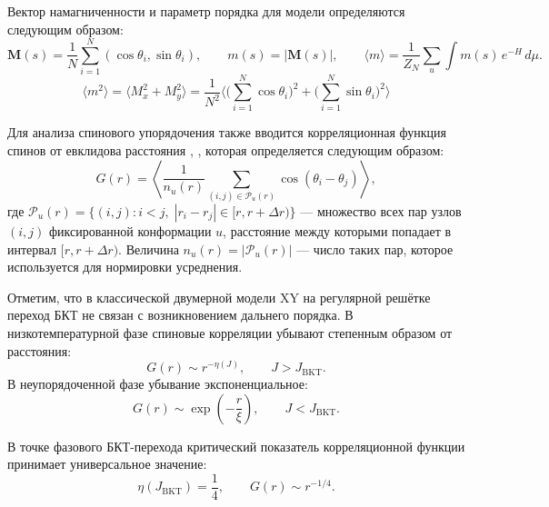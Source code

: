   
 Вектор намагниченности и параметр порядка для модели определяются следующим образом:
 \begin{equation}
 		\label{xy_mean_magnetization}
 	\mathbf M(s)=\frac{1}{N}\sum_{i=1}^N (\cos\theta_i,\sin\theta_i),\qquad m(s)=|\mathbf M(s)|,\qquad \langle m\rangle=\frac{1}{Z_N}\sum_{u}\int m(s)\,e^{-H}\,d\mu.
 \end{equation}
  \begin{equation}
 \langle m^2\rangle
 = \Big\langle M_x^2+M_y^2\Big\rangle
 = \frac{1}{N^2}\Big\langle \Big(\sum_{i=1}^N \cos\theta_i\Big)^2
 + \Big(\sum_{i=1}^N \sin\theta_i\Big)^2 \Big\rangle
  \end{equation}
  
  
  Для анализа спинового упорядочения также вводится корреляционная функция
  спинов от евклидова расстояния \cite{Berezinskii1970ZhETF}, \cite{kosterlitz1973ordering}, которая определяется следующим образом: 
  \begin{equation}
  	\label{xy_spin_correlation}
  	G(r)
  	=
  	\left\langle
  	\frac{1}{n_u(r)}
  	\sum_{(i,j)\in \mathcal P_u(r)}
  	\cos(\theta_i-\theta_j)
  	\right\rangle ,
  \end{equation} 
  где $
  	\mathcal P_u(r)
  	=	\{(i,j): i<j,\; |r_i-r_j|\in [r,r+\Delta r)\}  $ --- множество всех пар узлов $(i,j)$ фиксированной 
  	конформации $u$, расстояние между которыми попадает в интервал
  	$[r,r+\Delta r)$.
  	Величина $n_u(r)=|\mathcal P_u(r)|$  --- число таких пар, которое используется для нормировки усреднения. 
  	
  	
  	Отметим, что в классической двумерной модели XY на регулярной решётке
  	переход БКТ  не связан с возникновением дальнего порядка. 
  	В низкотемпературной фазе спиновые корреляции убывают
  	степенным образом от расстояния:
  	\begin{equation}
  		\label{xy_bkt_power_law}
  		G(r)\sim r^{-\eta(J)}, \qquad J>J_{\mathrm{BKT}}. 
  	\end{equation}
  	В неупорядоченной фазе убывание экспоненциальное:
  	\begin{equation}
  		\label{xy_bkt_exponential}
  		G(r)\sim \exp\!\left(-\frac{r}{\xi}\right),
  		\qquad J<J_{\mathrm{BKT}} .
  	\end{equation}
  	
  	В точке фазового БКТ-перехода критический показатель корреляционной функции
  	принимает универсальное значение: 
  	\begin{equation}
  		\label{xy_bkt_eta}
  		\eta(J_{\mathrm{BKT}})=\frac{1}{4},
  		\qquad
  		G(r)\sim r^{-1/4}.
  	\end{equation} 
  
